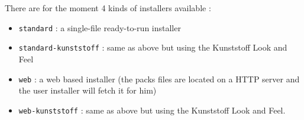 There are for the moment 4 kinds of installers available :
\begin{itemize}

  \item \texttt{standard} : a single-file ready-to-run installer
  \item \texttt{standard-kunststoff} : same as above but using the Kunststoff
  Look and Feel
  \item \texttt{web} : a web based installer (the packs files are located on a
  HTTP server and the user installer will fetch it for him)
  \item \texttt{web-kunststoff} : same as above but using the Kunststoff
  Look and Feel.

\end{itemize}\
